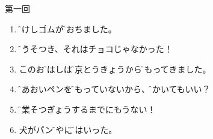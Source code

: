 \documentclass[intermediate]{grampig}
\begin{document}
	{\Large {} \hfill 第一回} \vspace{1em}
	
	\begin{enumerate}
		\item \parbox[t]{\linewidth}{\f{消}{け}しゴムが\e\ansline{}\f{落}{お}ちました。\hfill {}}
		\bh\strut
		
		\item \f{嘘}{うそ}つき、それはチョコじゃなかった！\hfill {}
		\bh\strut
		
		\item このお\f{箸}{はし}は\f{東京}{とうきょう}から\f{持}{も}ってきました。\hfill {}
		\bh\strut
		
		\item \f{青}{あお}いペンを\f{持}{も}っていないから、\e\ansline{}\f{書}{か}いてもいい？ \hfill {}
		\bh\strut
		
		\item \f{卒業}{そつぎょう}するまでにもうない！ \hfill {} 
		\bh\strut
		
		\item \e\ansline{}犬がパン\f{屋}{や}に\f{入}{はい}った。\hfill {}
		\bh\strut
	\end{enumerate}
\end{document}
